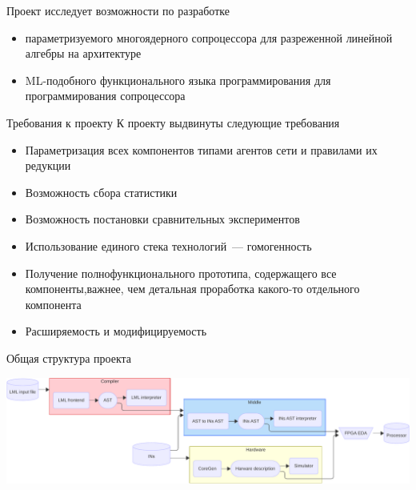 \documentclass
  [ russian
  , aspectratio=169 %
  ] {beamer}
\begin{document}
\begin{frame}{\Lamagraph{}}
    Проект \Lamagraph{} исследует возможности по разработке
    \begin{itemize}
        \item параметризуемого многоядерного сопроцессора для разреженной линейной алгебры на архитектуре \INs{}
        \item ML-подобного функционального языка программирования для программирования сопроцессора
    \end{itemize}
\end{frame}

\begin{frame}{Требования к проекту}
    К проекту выдвинуты следующие требования
    \begin{itemize}
        \item Параметризация всех компонентов типами агентов сети и правилами их редукции
        \item Возможность сбора статистики
        \item Возможность постановки сравнительных экспериментов
        \item Использование единого стека технологий~--- гомогенность
        \item Получение полнофункционального прототипа, содержащего все компоненты,важнее, чем детальная проработка какого-то отдельного компонента
        \item Расширяемость и модифицируемость
    \end{itemize}
\end{frame}

\begin{frame}{Общая структура проекта}
    \begin{center}
        \includegraphics[width=\linewidth]{figures/lamagraph-big-horiz.pdf}
    \end{center}
\end{frame}
\end{document}
